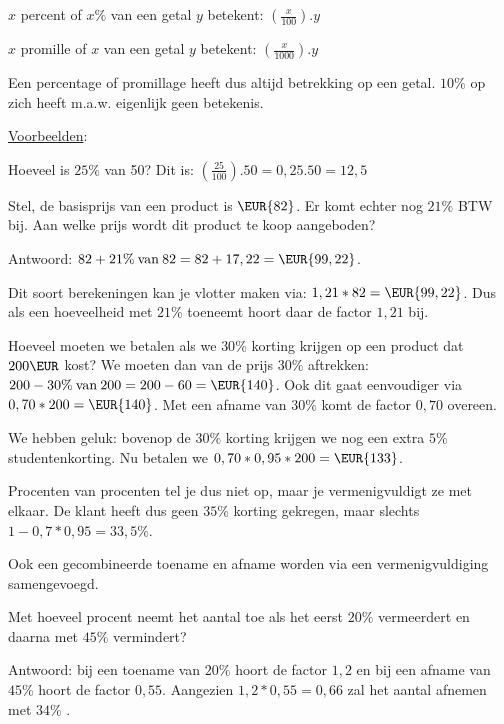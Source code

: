 $x$ percent of $x\%$ van een getal $y$ betekent: ${\displaystyle \left(\frac{x}{100}\right).y}$

\noindent $x$ promille of $x$ \textpertenthousand van een getal $y$ betekent:
${\displaystyle \left(\frac{x}{1000}\right).y}$

\noindent Een percentage of promillage heeft dus altijd betrekking
op een getal. $10\%$ op zich heeft m.a.w. eigenlijk geen betekenis.

\medskip{}


\uline{Voorbeelden}:

Hoeveel is $25\%$ van 50? Dit is: ${\displaystyle \left(\frac{25}{100}\right).50=0,25.50=12,5}$

Stel, de basisprijs van een product is $\EUR{82}$. Er komt
echter nog $21\%$ BTW bij. Aan welke prijs wordt dit product te koop
aangeboden?

Antwoord: ${\displaystyle 82+21\%\:\mathrm{van\:}82=82+17,22=\EUR{99,22}}$.

Dit soort berekeningen kan je vlotter maken via: $1,21*82=\EUR{99,22}$.
Dus als een hoeveelheid met $21\%$ toeneemt hoort daar de factor
$1,21$ bij.

Hoeveel moeten we betalen als we $30\%$ korting krijgen op een product
dat $200\EUR$ kost? We moeten dan van de prijs $30\%$
aftrekken: ${\displaystyle 200-30\%\:\mathrm{van\:}200=200-60=\EUR{140}}$.
Ook dit gaat eenvoudiger via $0,70*200=\EUR{140}$. Met een afname
van $30\%$ komt de factor $0,70$ overeen.

\medskip{}


We hebben geluk: bovenop de $30\%$ korting krijgen we nog een extra
$5\%$ studentenkorting. Nu betalen we $0,70*0,95*200=\EUR{133}$.

Procenten van procenten tel je dus niet op, maar je vermenigvuldigt
ze met elkaar. De klant heeft dus geen $35\%$ korting gekregen, maar
slechts $1-0,7*0,95=33,5\%$.

\medskip{}


\noindent Ook een gecombineerde toename en afname worden via een vermenigvuldiging
samengevoegd.

\noindent Met hoeveel procent neemt het aantal toe als het eerst $20\%$
vermeerdert en daarna met $45\%$ vermindert?

\noindent Antwoord: bij een toename van $20\%$ hoort de factor $1,2$
en bij een afname van $45\%$ hoort de factor $0,55$. Aangezien $1,2*0,55=0,66$
zal het aantal afnemen met $34\%$ .

\medskip{}


